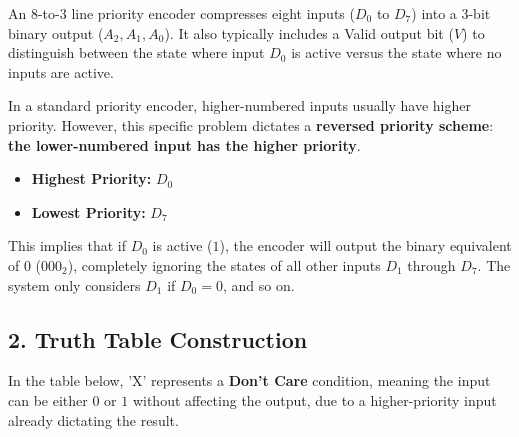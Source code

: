 \documentclass[12pt,a3paper]{article}
\begin{document}
\begin{enumerate}
\begin{tcolorbox}[enhanced,breakable,ansbox,colback=cD!4,colframe=cD,boxrule=0.8pt,arc=5pt,title={\textbf{Answer}},fonttitle=\bfseries\color{white},colbacktitle=cD]
An 8-to-3 line priority encoder compresses eight inputs ($D_0$ to $D_7$) into a 3-bit binary output ($A_2, A_1, A_0$). It also typically includes a Valid output bit ($V$) to distinguish between the state where input $D_0$ is active versus the state where no inputs are active.

In a standard priority encoder, higher-numbered inputs usually have higher priority. However, this specific problem dictates a \textbf{reversed priority scheme}: \textbf{the lower-numbered input has the higher priority}. 
\begin{itemize}
    \item \textbf{Highest Priority:} $D_0$
    \item \textbf{Lowest Priority:} $D_7$
\end{itemize}

This implies that if $D_0$ is active ($1$), the encoder will output the binary equivalent of $0$ ($000_2$), completely ignoring the states of all other inputs $D_1$ through $D_7$. The system only considers $D_1$ if $D_0 = 0$, and so on.

\subsection*{2. Truth Table Construction}

In the table below, 'X' represents a \textbf{Don't Care} condition, meaning the input can be either $0$ or $1$ without affecting the output, due to a higher-priority input already dictating the result.


\end{tcolorbox}
\end{enumerate}
\end{document}
